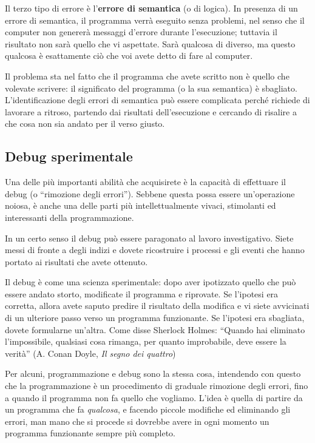 \documentclass[10pt]{book}
\begin{document}
Il terzo tipo di errore è l'{\bf errore di semantica} (o di logica). In presenza di un errore di semantica, il programma verrà eseguito senza problemi, nel senso che il computer non genererà messaggi d'errore durante l'esecuzione; tuttavia il risultato non sarà quello che vi aspettate. Sarà qualcosa di diverso, ma questo qualcosa è esattamente ciò che voi avete detto di fare al computer.

Il problema sta nel fatto che il programma che avete scritto non è quello che volevate scrivere: il significato del programma (o la sua semantica) è sbagliato. L'identificazione degli errori di semantica può essere complicata perché richiede di lavorare a ritroso, partendo dai risultati dell'esecuzione e cercando di risalire a che cosa non sia andato per il verso giusto.

\subsection{Debug sperimentale}

Una delle più importanti abilità che acquisirete è la capacità di effettuare il debug (o ``rimozione degli errori''). Sebbene questa possa essere un'operazione noiosa, è anche una delle parti più intellettualmente vivaci, stimolanti ed interessanti della programmazione.

In un certo senso il debug può essere paragonato al lavoro investigativo. Siete messi di fronte a degli indizi e dovete ricostruire i processi e gli eventi che hanno portato ai risultati che avete ottenuto.

Il debug è come una scienza sperimentale: dopo aver ipotizzato quello che può essere andato storto, modificate il programma e riprovate. Se l'ipotesi era corretta, allora avete saputo predire il risultato della modifica e vi siete avvicinati di un ulteriore passo verso un programma funzionante. Se l'ipotesi era sbagliata, dovete formularne un'altra. Come disse Sherlock Holmes: ``Quando hai eliminato l'impossibile, qualsiasi cosa rimanga, per quanto improbabile, deve essere la verità''
(A. Conan Doyle, {\em Il segno dei quattro})

Per alcuni, programmazione e debug sono la stessa cosa, intendendo con questo che la programmazione è un procedimento di graduale rimozione degli errori, fino a quando il programma non fa quello che vogliamo. L'idea è quella di partire da un programma che fa {\em qualcosa}, e facendo piccole modifiche ed eliminando gli errori, man mano che si procede si dovrebbe avere in ogni momento un programma funzionante sempre più completo.
\end{document}

